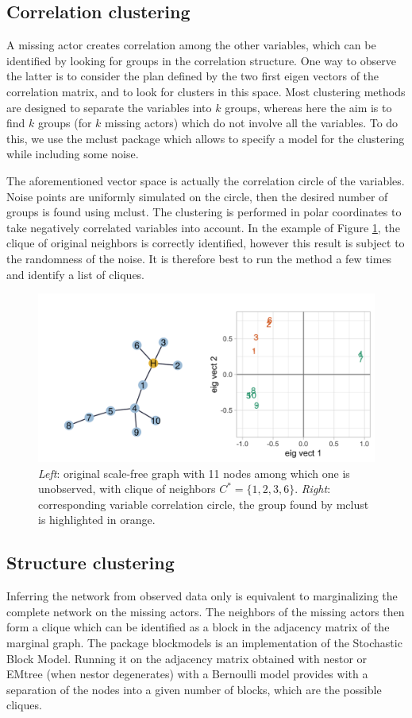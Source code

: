 \begin{subappendices}
\tocless\subsection{Correlation clustering}
A missing actor creates correlation among the other variables, which can be identified by looking for groups in the correlation structure. One way to observe the latter is to consider the plan defined by the two first eigen vectors of the correlation matrix, and to look for clusters in this space. Most clustering methods are designed to separate the variables into $k$ groups, whereas here the aim is to find $k$ groups (for $k$ missing actors) which do not involve all the variables. To do this, we use the mclust package which allows to specify a model for the clustering while including some noise.

The aforementioned vector space  is actually the correlation circle of the variables. Noise points are uniformly simulated on the circle, then the desired number of groups is found using mclust. The clustering is performed in polar coordinates to take negatively correlated variables into account. In the example of Figure \ref{SFmclust}, the clique of original neighbors is correctly identified, however this result is subject to the randomness of the noise. It is therefore best to run the method a few times and identify a list of cliques.


\begin{figure}
\centering
\includegraphics[width=0.7\linewidth]{figs/facetmclust.png}
\caption{\textit{Left}: original scale-free graph with 11 nodes among which one is unobserved, with clique of neighbors $C^*=\{1,2,3,6\}$. \textit{Right}: corresponding variable correlation circle, the group found by mclust is highlighted in orange.}
\label{SFmclust}
\end{figure}


\tocless\subsection{Structure clustering}
Inferring the network from observed data only is equivalent to marginalizing the complete network on the missing actors. The neighbors of the missing actors then form a clique which can be identified as a block in the adjacency matrix of the marginal graph. The package blockmodels is an implementation of the Stochastic Block Model. Running it on the adjacency matrix obtained with nestor or EMtree (when nestor degenerates) with a Bernoulli model provides with a separation of the nodes into a given number of blocks, which are the possible cliques.


\end{subappendices}

